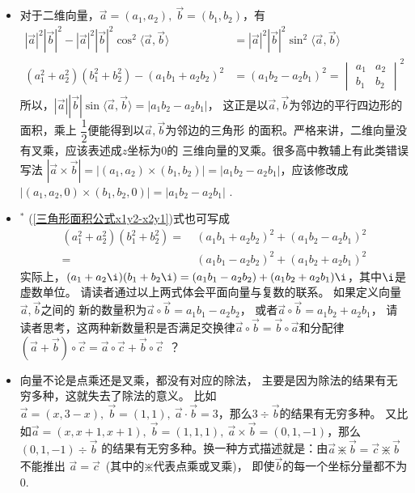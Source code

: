 \begin{itemize}[leftmargin=\inteval{\myitemleftmargin}pt,itemsep=
   \inteval{\myitemitempsep}pt,topsep=\inteval{\myitemtopsep}pt]
\item 对于二维向量，$ \vec{a}=(a_1,a_2),\ \vec{b}=(b_1,b_2) $，有
\begin{align}
    |\vec{a}|^2|\vec{b}|^2-|\vec{a}|^2|\vec{b}|^2
    \cos^2\langle\vec{a},\vec{b}\rangle 
    &=|\vec{a}|^2|\vec{b}|^2\sin^2\langle\vec{a},\vec{b}\rangle \nonumber\\
    (a_1^2+a_2^2)(b_1^2+b_2^2)-(a_1b_1+a_2b_2)^2 &=
    (a_1b_2-a_2b_1)^2=
    \begin{vmatrix}
        a_{1} & a_{2} \\
        b_{1} & b_{2}
    \end{vmatrix}
    ^2 \label{三角形面积公式x1y2-x2y1}
\end{align}
所以，$ |\vec{a}||\vec{b}|\sin\langle\vec{a},\vec{b}
\rangle=|a_1b_2-a_2b_1| $，
这正是以$ \vec{a},\vec{b} $为邻边的平行四边形的面积，乘上
$ \dfrac{1}{2} $便能得到以$ \vec{a},\vec{b} $为邻边的三角形
的面积。严格来讲，二维向量没有叉乘，应该表述成$ z $坐标为0的
三维向量的叉乘。很多高中教辅上有此类错误写法
$ |\vec{a}\times\vec{b}|=|(a_1,a_2)\times (b_1,b_2)|=
|a_1b_2-a_2b_1| $，应该修改成
$ |(a_1,a_2,0)\times (b_1,b_2,0)|=|a_1b_2-a_2b_1| $ . \\

\item $^*$ (\ref{三角形面积公式x1y2-x2y1})式也可写成
\begin{align} 
    (a_1^2+a_2^2)(b_1^2+b_2^2)=&\  (a_1b_1+a_2b_2)^2+
    (a_1b_2-a_2b_1)^2 \\
    =&\  (a_1b_1-a_2b_2)^2+(a_1b_2+a_2b_1)^2 
\end{align}
实际上，$ (a_1+a_2 \i)(b_1+b_2 \i)=(a_1b_1-a_2b_2)+(a_1b_2+
a_2b_1)\i $，其中$ \i $是虚数单位。
请读者通过以上两式体会平面向量与复数的联系。
如果定义向量$ \vec{a},\vec{b} $之间的
新的数量积为$ \vec{a} \circ \vec{b}=a_1b_1-a_2b_2 $，
或者$ \vec{a} \circ \vec{b}=a_1b_2+a_2b_1 $，
请读者思考，这两种新数量积是否满足交换律$ \vec{a}\circ\vec{b}
= \vec{b} \circ \vec{a} $和分配律
$ (\vec{a} + \vec{b})\circ \vec{c}=
\vec{a} \circ \vec{c}+\vec{b} \circ
\vec{c} $\ ？

\item 向量不论是点乘还是叉乘，都没有对应的除法，
主要是因为除法的结果有无穷多种，这就失去了除法的意义。
比如$ \vec{a}=(x,3-x),\ \vec{b}=(1,1),\ 
\vec{a}\cdot \vec{b}=3 $，那么$ 3\div \vec{b} $的结果有无穷多种。
又比如$ \vec{a}=(x,x+1,x+1),\ \vec{b}=(1,1,1),\ 
\vec{a}\times\vec{b}=(0,1,-1) $，那么$ (0,1,-1) \div \vec{b} $
的结果有无穷多种。换一种方式描述就是：由$ \vec{a}\divideontimes 
\vec{b}=\vec{c}\divideontimes \vec{b} $不能推出
$ \vec{a}=\vec{c} $\ (其中的$ \divideontimes $代表点乘或叉乘)，
即使$ \vec{b} $的每一个坐标分量都不为0.

\end{itemize}

